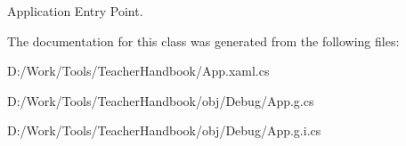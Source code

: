 Application Entry Point. 



The documentation for this class was generated from the following files\+:\begin{DoxyCompactItemize}
\item 
D\+:/\+Work/\+Tools/\+Teacher\+Handbook/App.\+xaml.\+cs\item 
D\+:/\+Work/\+Tools/\+Teacher\+Handbook/obj/\+Debug/App.\+g.\+cs\item 
D\+:/\+Work/\+Tools/\+Teacher\+Handbook/obj/\+Debug/App.\+g.\+i.\+cs\end{DoxyCompactItemize}
